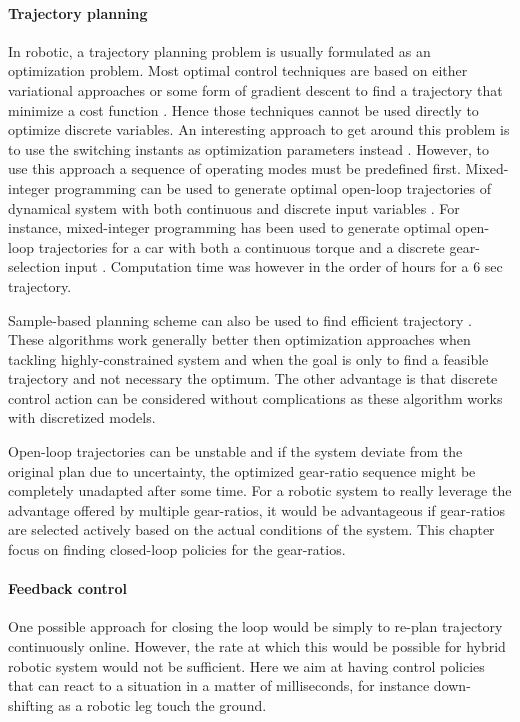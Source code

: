 \paragraph{Trajectory planning}

In robotic, a trajectory planning problem is usually formulated as an optimization problem. Most optimal control techniques are based on either variational approaches or some form of gradient descent to find a trajectory that minimize a cost function \cite{betts_practical_2010}. Hence those techniques cannot be used directly to optimize discrete variables. An interesting approach to get around this problem is to use the switching instants as optimization parameters instead \cite{xu_optimal_2004}\cite{majdoub_hybrid_2010}. However, to use this approach a sequence of operating modes must be predefined first. Mixed-integer programming can be used to generate optimal open-loop trajectories of dynamical system with both continuous and discrete input variables \cite{richards_spacecraft_2002}. For instance, mixed-integer programming has been used to generate optimal open-loop trajectories for a car with both a continuous torque and a discrete gear-selection input \cite{gerdts_solving_2005}. Computation time was however in the order of hours for a 6 sec trajectory. 

Sample-based planning scheme can also be used to find efficient trajectory \cite{lavalle_planning_2006}. These algorithms work generally better then optimization approaches when tackling highly-constrained system and when the goal is only to find a feasible trajectory and not necessary the optimum. The other advantage is that discrete control action can be considered without complications as these algorithm works with discretized models.

Open-loop trajectories can be unstable and if the system deviate from the original plan due to uncertainty, the optimized gear-ratio sequence might be completely unadapted after some time. For a robotic system to really leverage the advantage offered by multiple gear-ratios, it would be advantageous if gear-ratios are selected actively based on the actual conditions of the system. This chapter focus on finding closed-loop policies for the gear-ratios.

\paragraph{Feedback control}

One possible approach for closing the loop would be simply to re-plan trajectory continuously online. However, the rate at which this would be possible for hybrid robotic system would not be sufficient. Here we aim at having control policies that can react to a situation in a matter of milliseconds, for instance down-shifting as a robotic leg touch the ground. 

